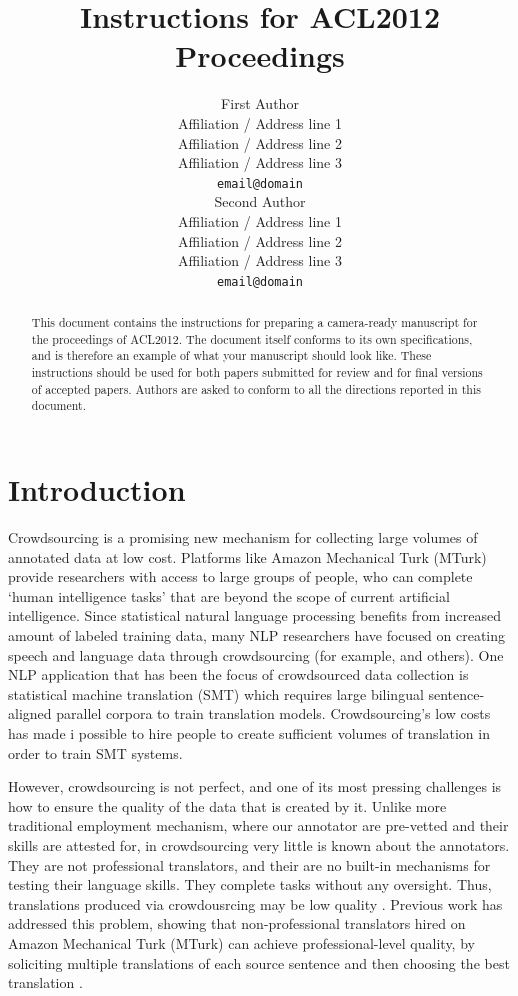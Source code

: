 \documentclass[11pt]{article}
\title{Instructions for ACL2012 Proceedings}
\author{First Author \\
  Affiliation / Address line 1 \\
  Affiliation / Address line 2 \\
  Affiliation / Address line 3 \\
  {\tt email@domain} \\\And
  Second Author \\
  Affiliation / Address line 1 \\
  Affiliation / Address line 2 \\
  Affiliation / Address line 3 \\
  {\tt email@domain} \\}
\date{}
\begin{document}
\maketitle
\begin{abstract}
  This document contains the instructions for preparing a camera-ready manuscript for the proceedings of ACL2012. The document itself conforms to its own specifications, and is therefore an example of what your manuscript should look like. These instructions should be used for both papers submitted for review and for final versions of accepted papers. Authors are asked to conform to all the directions reported in this document.
\end{abstract}

\section{Introduction}

Crowdsourcing is a promising new mechanism for collecting large volumes of annotated data at low cost.  Platforms like Amazon Mechanical Turk (MTurk) provide researchers with access to large groups of people, who can complete `human intelligence tasks' that are beyond the scope of current artificial intelligence.  Since statistical natural language processing benefits from increased amount of labeled training data, many NLP researchers have focused on creating speech and language data through crowdsourcing (for example,   and others).  One NLP application that has been the focus of crowdsourced data collection is statistical machine translation (SMT) which requires large bilingual sentence-aligned parallel corpora to train translation models.  Crowdsourcing's low costs has made i possible to hire people to create sufficient volumes of translation in order to train SMT systems.

However, crowdsourcing is not perfect, and one of its most pressing challenges is how to ensure the quality of the data that is created by it.  Unlike more traditional employment mechanism, where our annotator are pre-vetted and their skills are attested for, in crowdsourcing very little is known about the annotators.  They are not professional translators, and their are no built-in mechanisms for testing their language skills.  They complete tasks without any oversight. Thus, translations produced via crowdousrcing may be low quality .
Previous work has addressed this problem, showing that non-professional translators hired on Amazon Mechanical Turk (MTurk) can achieve professional-level quality, by soliciting multiple translations of each source sentence and then choosing the best translation \cite{zaidan-callisonburch:2011:ACL-HLT2011a}.
\end{document}
